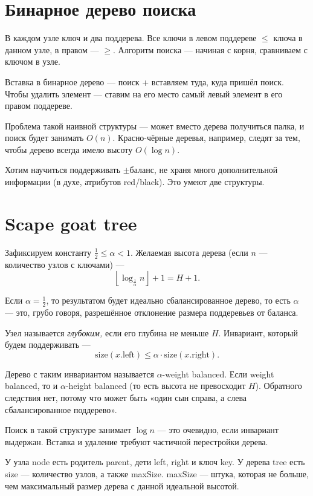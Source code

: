 \documentclass[a4paper,11pt]{article}
\begin{document}
\section{Бинарное дерево поиска}

В каждом узле ключ и два поддерева. Все ключи в левом поддереве $\le$ ключа в данном узле, в правом — $\ge$. Алгоритм поиска — начиная с корня, сравниваем с ключом в узле.

Вставка в бинарное дерево — поиск + вставляем туда, куда пришёл поиск. Чтобы удалить элемент --- ставим на его место самый левый элемент в его правом поддереве.

Проблема такой наивной структуры — может вместо дерева получиться палка, и поиск будет занимать $O(n)$. Красно-чёрные деревья, например, следят за тем, чтобы дерево всегда имело высоту $O(\log n)$.

Хотим научиться поддерживать $\pm$баланс, не храня много дополнительной информации (в духе, атрибутов red/black). Это умеют две структуры.

\section{Scape goat tree}

Зафиксируем константу $\frac{1}{2} \le \alpha < 1$. Желаемая высота дерева (если $n$ — количество узлов с ключами) —
$$\left\lfloor \log_{\frac{1}{\alpha}} n \right\rfloor + 1= H+1.$$

Если $\alpha = \frac{1}{2}$, то результатом будет идеально сбалансированное дерево, то есть $\alpha$ — это, грубо говоря, разрешённое отклонение размера поддеревьев от баланса.

Узел называется {\it глубоким,} если его глубина не меньше $H$. Инвариант, который будем поддерживать —
	$$\mathrm{size} (x.\text{left}) \le \alpha \cdot \mathrm{size} (x.\text{right}).$$

Дерево с таким инвариантом называется $\alpha$-weight balanced. Если weight balanced, то и $\alpha$-height balanced (то есть высота не превосходит $H$). Обратного следствия нет, потому что может быть «один сын справа, а слева сбалансированное поддерево».

Поиск в такой структуре занимает $\log n$ — это очевидно, если инвариант выдержан. Вставка и удаление требуют частичной перестройки дерева.

У узла node есть родитель parent, дети left, right и ключ key. У дерева tree есть size — количество узлов, а также maxSize. maxSize — штука, которая не больше, чем максимальный размер дерева с данной идеальной высотой.
\end{document}
